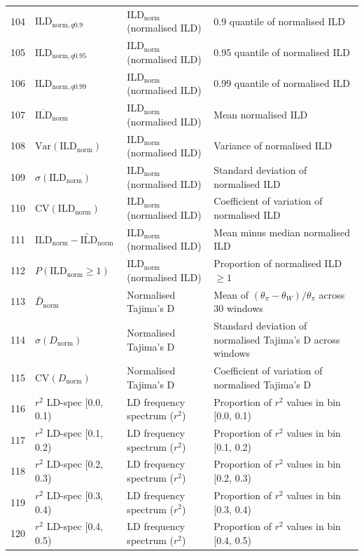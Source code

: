 \begin{longtable}{@{}rllp{7.5cm}@{}}
104 & ILD$_{\mathrm{norm},q0.9}$ & ILD$_\mathrm{norm}$ (normalised ILD) & 0.9 quantile of normalised ILD \\
105 & ILD$_{\mathrm{norm},q0.95}$ & ILD$_\mathrm{norm}$ (normalised ILD) & 0.95 quantile of normalised ILD \\
106 & ILD$_{\mathrm{norm},q0.99}$ & ILD$_\mathrm{norm}$ (normalised ILD) & 0.99 quantile of normalised ILD \\
107 & $\overline{\mathrm{ILD}}_\mathrm{norm}$ & ILD$_\mathrm{norm}$ (normalised ILD) & Mean normalised ILD \\
108 & $\mathrm{Var}(\mathrm{ILD}_\mathrm{norm})$ & ILD$_\mathrm{norm}$ (normalised ILD) & Variance of normalised ILD \\
109 & $\sigma(\mathrm{ILD}_\mathrm{norm})$ & ILD$_\mathrm{norm}$ (normalised ILD) & Standard deviation of normalised ILD \\
110 & $\mathrm{CV}(\mathrm{ILD}_\mathrm{norm})$ & ILD$_\mathrm{norm}$ (normalised ILD) & Coefficient of variation of normalised ILD \\
111 & $\overline{\mathrm{ILD}}_\mathrm{norm} - \widetilde{\mathrm{ILD}}_\mathrm{norm}$ & ILD$_\mathrm{norm}$ (normalised ILD) & Mean minus median normalised ILD \\
112 & $P(\mathrm{ILD}_\mathrm{norm} \geq 1)$ & ILD$_\mathrm{norm}$ (normalised ILD) & Proportion of normalised ILD $\geq 1$ \\
\midrule
113 & $\bar{D}_\mathrm{norm}$ & Normalised Tajima's D & Mean of $(\theta_\pi - \theta_W)/\theta_\pi$ across 30 windows \\
114 & $\sigma(D_\mathrm{norm})$ & Normalised Tajima's D & Standard deviation of normalised Tajima's D across windows \\
115 & $\mathrm{CV}(D_\mathrm{norm})$ & Normalised Tajima's D & Coefficient of variation of normalised Tajima's D \\
\midrule
116 & $r^2$ LD-spec [0.0, 0.1) & LD frequency spectrum ($r^2$) & Proportion of $r^2$ values in bin [0.0, 0.1) \\
117 & $r^2$ LD-spec [0.1, 0.2) & LD frequency spectrum ($r^2$) & Proportion of $r^2$ values in bin [0.1, 0.2) \\
118 & $r^2$ LD-spec [0.2, 0.3) & LD frequency spectrum ($r^2$) & Proportion of $r^2$ values in bin [0.2, 0.3) \\
119 & $r^2$ LD-spec [0.3, 0.4) & LD frequency spectrum ($r^2$) & Proportion of $r^2$ values in bin [0.3, 0.4) \\
120 & $r^2$ LD-spec [0.4, 0.5) & LD frequency spectrum ($r^2$) & Proportion of $r^2$ values in bin [0.4, 0.5) \\

\end{longtable}
